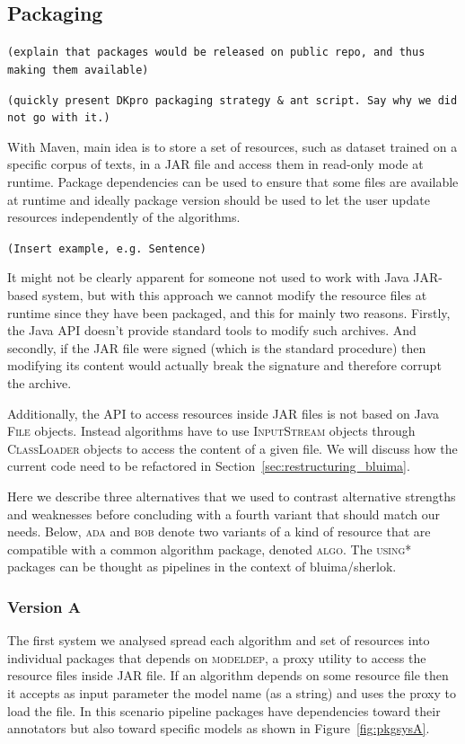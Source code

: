 \documentclass{article}
\newcommand{\ID}[1]{{\textsc{#1}}}
\newcommand{\JAR}{JAR\xspace}
\newcommand{\TODO}[1]{\texttt{\textcolor{YellowOrange}{(#1)}}} %
\begin{document}
\subsection{Packaging}

\TODO{explain that packages would be released on public repo, and thus making them available}

\TODO{quickly present DKpro packaging strategy \& ant script. Say why we did not go with it.}

With Maven, main idea is to store a set of resources, such as dataset trained on a specific corpus of texts, in a \JAR file and access them in read-only mode at runtime. Package dependencies can be used to ensure that some files are available at runtime and ideally package version should be used to let the user update resources independently of the algorithms.

\TODO{Insert example, e.g. Sentence}

It might not be clearly apparent for someone not used to work with Java \JAR-based system, but with
this approach we cannot modify the resource files at runtime since they have been packaged, and this
for mainly two reasons. Firstly, the Java API doesn't provide standard tools to modify such
archives.  And secondly, if the \JAR file were signed (which is the standard procedure) then
modifying its content would actually break the signature and therefore corrupt the archive.

Additionally, the API to access resources inside \JAR files is not based on Java \ID{File} objects.
Instead algorithms have to use \ID{InputStream} objects through \ID{ClassLoader} objects to access
the content of a given file. We will discuss how the current code need to be refactored in
Section~\ref{sec:restructuring_bluima}.

Here we describe three alternatives that we used to contrast alternative strengths and weaknesses before concluding with a fourth variant that should match our needs. Below, \ID{ada} and \ID{bob} denote two variants of a kind of resource that are compatible with a common algorithm package, denoted \ID{algo}. The \ID{using*} packages can be thought as pipelines in the context of bluima/sherlok.

\subsubsection{Version A}

The first system we analysed spread each algorithm and set of resources into individual packages
that depends on \ID{modeldep}, a proxy utility to access the resource files inside \JAR file. If an
algorithm depends on some resource file then it accepts as input parameter the model name (as a
string) and uses the proxy to load the file. In this scenario pipeline packages have dependencies
toward their annotators but also toward specific models as shown in Figure~\ref{fig:pkgsysA}.
\end{document}
